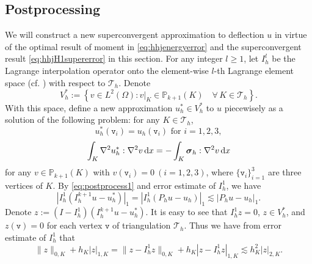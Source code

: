 \subsection{Postprocessing}
We will construct a new superconvergent approximation to deflection $u$ in virtue of the optimal result of moment in \eqref{eq:hhjenergyerror} and the superconvergent result \eqref{eq:hhjH1supererror} in this section. For any integer $l\geq1$,
let $I_h^{l}$ be the Lagrange interpolation operator onto the element-wise $l$-th Lagrange element space (cf. \cite{Ciarlet1978,BrennerScott2008}) with respect to $\mathcal{T}_h$. Denote
\[
V_h^{\ast}:=\left\{v\in L^2(\Omega): v|_K\in \mathbb P_{k+1}(K)\quad \forall\,K\in\mathcal
{T}_h\right\}.
\]
With this space, define a new approximation $u_h^{\ast}\in V_h^{\ast}$ to $u$ piecewisely as a solution of the following problem: for any $K\in\mathcal{T}_h$,
\begin{equation}\label{eq:postprocess1}
u_h^{\ast}(\texttt{v}_i)=u_h(\texttt{v}_i) \textrm{ for } i=1,2,3,
\end{equation}
\begin{align}
\int_K\nabla^2u_h^{\ast}:\nabla^2v\,{\rm d}x=-\int_K\boldsymbol{\sigma}_h:\nabla^2v\,{\rm d}x \label{eq:postprocess2}
\end{align}
for any $v\in \mathbb P_{k+1}(K)$ with $v(\texttt{v}_i)=0~(i=1,2,3)$,
where $\{\texttt{v}_i\}_{i=1}^3$ are three vertices of $K$.
By \eqref{eq:postprocess1} and error estimate of $I_h^1$, we have
\begin{equation}\label{eq:postproestimate1}
|I_h^1(I_h^{k+1}u-u_h^{\ast})|_{1}=|I_h^1(P_hu-u_h)|_{1}\lesssim |P_hu-u_h|_{1}.
\end{equation}
Denote $z:=(I-I_h^1)(I_h^{k+1}u-u_h^{\ast})$. It is easy to see that $I_h^1z=0$, $z\in V_h^{\ast}$, and $z(\texttt{v})=0$ for each vertex $\texttt{v}$ of triangulation $\mathcal{T}_h$. Thus we have from error estimate of $I_h^1$ that
\begin{equation}\label{eq:z1}
\|z\|_{0, K}+h_K|z|_{1,K}=\|z-I_h^1z\|_{0, K}+h_K|z-I_h^1z|_{1,K}\lesssim h_K^2|z|_{2,K}.
\end{equation}


